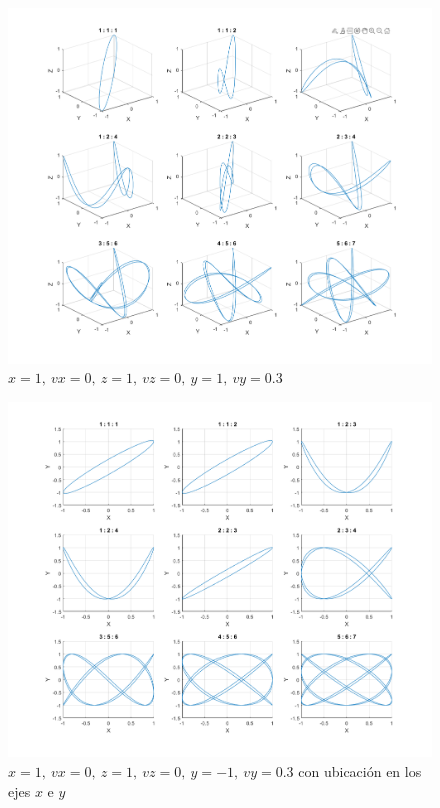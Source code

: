 \documentclass{article}
\begin{document}
\clearpage
\newpage

\begin{figure}
\centering
    \includegraphics[width=1\textwidth]{images/03c1.png}
    \caption{$x = 1,~vx = 0,~z = 1,~vz = 0,~y = 1,~vy = 0.3$}
\end{figure}

\clearpage
\newpage

\begin{figure}
\centering
    \includegraphics[width=1\textwidth]{images/03c2.png}
    \caption{$x = 1,~vx = 0,~z = 1,~vz = 0,~y =-1,~vy = 0.3$ con ubicación en los ejes $x$ e $y$}
\end{figure}
\end{document}
